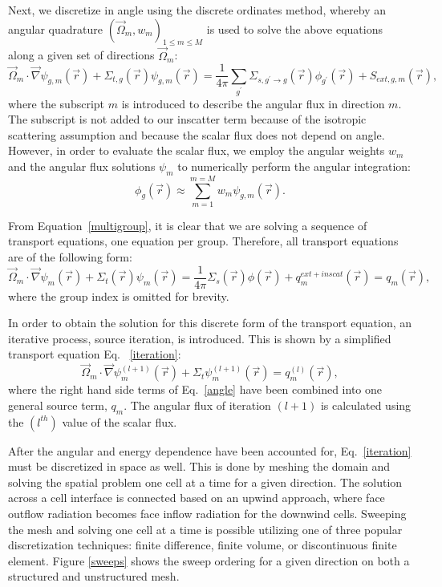 \documentclass[11pt, letterpaper,titlepage,oneside]{article}
\newcommand{\vr}{\vec{r}}
\newcommand{\vo}{\vec{\Omega}}
\begin{document}
Next, we discretize in angle using the discrete ordinates method\cite{denovo}, whereby an angular quadrature $\left( \vo_m, w_m \right)_{1 \le m \le M}$ is used to solve the above equations along a given set of directions $\vo_m$:
\begin{equation}
\vo_m \cdot \vec \nabla \psi_{g,m}(\vr) +\Sigma_{t,g}(\vr) \psi_{g,m}(\vr)  = \frac{1}{4\pi}\sum_{g^{\prime}}\Sigma_{s,g^{\prime}\to g}(\vr)\phi_{g^{\prime}}(\vr) + S_{ext,g,m}(\vr),
\label{angle}
\end{equation}
where the subscript $m$ is introduced to describe the angular flux in direction $m$. The subscript is not added to our inscatter term because of the isotropic scattering assumption and because the scalar flux does not depend on angle. However, in order to evaluate the scalar flux, we employ the angular weights $w_m$ and the angular flux solutions
$\psi_m$ to numerically perform the angular integration:
\begin{equation}
\label{def_scalar_flux_2}
\phi_g(\vr) \approx \sum_{m=1}^{m=M} w_m \psi_{g,m}(\vr).
\end{equation}

From Equation~\eqref{multigroup}, it is clear that we are solving a sequence of transport equations, one equation per group. Therefore, all transport equations are of the following form:
\begin{equation}
\vo_m \cdot \vec \nabla \psi_{m}(\vr) +\Sigma_{t}(\vr) \psi_{m}(\vr)  = \frac{1}{4\pi}\Sigma_{s}(\vr)\phi(\vr) + q^{ext+inscat}_m(\vr) = q_m(\vr),
\end{equation}
where the group index is omitted for brevity.

In order to obtain the solution for this discrete form of the transport equation, an iterative process, source iteration, is introduced. This is shown by a simplified transport equation Eq. ~\eqref{iteration}:
\begin{equation}
\vo_m \cdot \vec\nabla \psi_m^{(l+1)}(\vr) + \Sigma_t \psi_m^{(l+1)}(\vr) = q_m^{(l)}(\vr),
\label{iteration}
\end{equation}
where the right hand side terms of Eq.~\eqref{angle} have been combined into one general source term, $q_m$. The angular flux of iteration $(l+1)$ is calculated using the $(l^{th})$ value of the scalar flux.

After the angular and energy dependence have been accounted for, Eq.~\eqref{iteration} must be discretized in space as well. This is done by meshing the domain and solving the spatial problem one cell at a time for a given direction. The solution across a cell interface is connected based on an upwind approach, where face outflow radiation becomes face inflow radiation for the downwind cells. Sweeping the mesh and solving one cell at a time is possible utilizing one of three popular discretization techniques: finite difference\cite{fd}, finite volume\cite{fd}, or discontinuous finite element\cite{Reed}. Figure \ref{sweeps} shows the sweep ordering for a given direction on both a structured and unstructured mesh.
\end{document}
